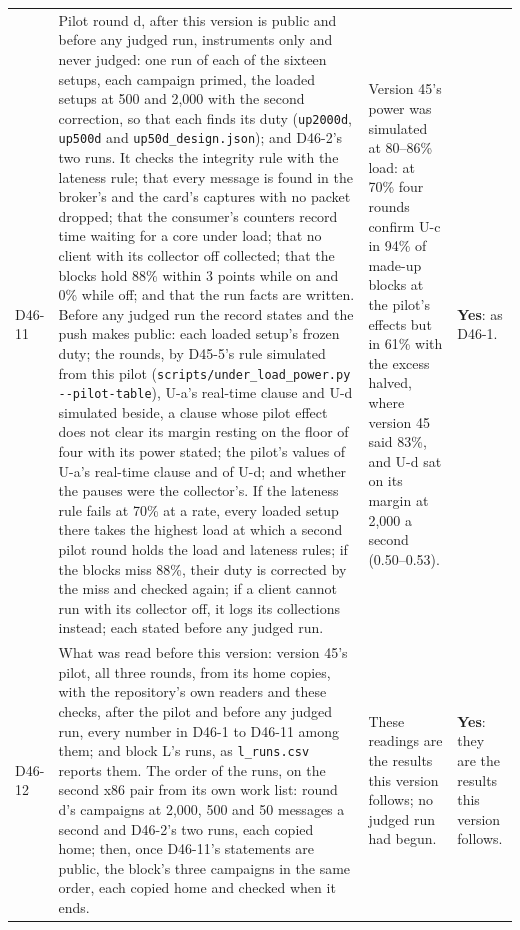 \documentclass[11pt]{article}
\begin{document}
{\begin{longtable}{@{}p{1.1cm} >{\raggedright\arraybackslash}p{6.1cm} >{\raggedright\arraybackslash}p{6.0cm} >{\raggedright\arraybackslash}p{2.2cm}@{}}
D46-11 & Pilot round d, after this version is public and before any judged run, instruments only and never judged: one run of each of the sixteen setups, each campaign primed, the loaded setups at 500 and 2,000 with the second correction, so that each finds its duty (\texttt{up2000d}, \texttt{up500d} and \texttt{up50d\_design.json}); and D46-2's two runs. It checks the integrity rule with the lateness rule; that every message is found in the broker's and the card's captures with no packet dropped; that the consumer's counters record time waiting for a core under load; that no client with its collector off collected; that the blocks hold 88\% within 3 points while on and 0\% while off; and that the run facts are written. Before any judged run the record states and the push makes public: each loaded setup's frozen duty; the rounds, by D45-5's rule simulated from this pilot (\texttt{scripts/under\_load\_power.py -{}-pilot-table}), U-a's real-time clause and U-d simulated beside, a clause whose pilot effect does not clear its margin resting on the floor of four with its power stated; the pilot's values of U-a's real-time clause and of U-d; and whether the pauses were the collector's. If the lateness rule fails at 70\% at a rate, every loaded setup there takes the highest load at which a second pilot round holds the load and lateness rules; if the blocks miss 88\%, their duty is corrected by the miss and checked again; if a client cannot run with its collector off, it logs its collections instead; each stated before any judged run. & Version 45's power was simulated at 80--86\% load: at 70\% four rounds confirm U-c in 94\% of made-up blocks at the pilot's effects but in 61\% with the excess halved, where version 45 said 83\%, and U-d sat on its margin at 2,000 a second (0.50--0.53). & \textbf{Yes}: as D46-1. \\
D46-12 & What was read before this version: version 45's pilot, all three rounds, from its home copies, with the repository's own readers and these checks, after the pilot and before any judged run, every number in D46-1 to D46-11 among them; and block L's runs, as \texttt{l\_runs.csv} reports them. The order of the runs, on the second x86 pair from its own work list: round d's campaigns at 2,000, 500 and 50 messages a second and D46-2's two runs, each copied home; then, once D46-11's statements are public, the block's three campaigns in the same order, each copied home and checked when it ends. & These readings are the results this version follows; no judged run had begun. & \textbf{Yes}: they are the results this version follows. \\
\bottomrule
\end{longtable}}
\end{document}
